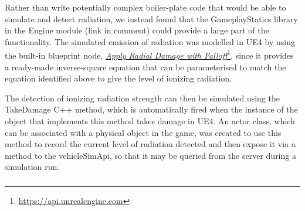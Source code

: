 Rather than write potentially complex boiler-plate code that would be able to simulate and detect radiation, we instead found that the GameplayStatics library in the Engine module (link in comment) %
could provide a large part of the functionality. The simulated emission of radiation was modelled in UE4 by using the built-in blueprint node,
\href{https://api.unrealengine.com/INT/API/Runtime/Engine/Kismet/UGameplayStatics/ApplyRadialDamageWithFalloff/index.html}{\emph{Apply Radial Damage with Falloff}}\footnote{\href{https://api.unrealengine.com/INT/API/Runtime/Engine/Kismet/UGameplayStatics/ApplyRadialDamageWithFalloff/index.html}{https://api.unrealengine.com}}, since it provides a ready-made inverse-square equation that can be parameterised to match the equation identified above to give the level of ionizing radiation.


The detection of ionizing radiation strength can then be simulated using the TakeDamage C++ method, which is automatically fired when the instance of the object that implements this method takes damage in UE4. An actor class, which can be associated with a physical object in the game, was created to use this method to record the current level of radiation detected and then expose it via a method to the vehicleSimApi, so that it may be queried from the server during a simulation run.

\subsubsection{}
